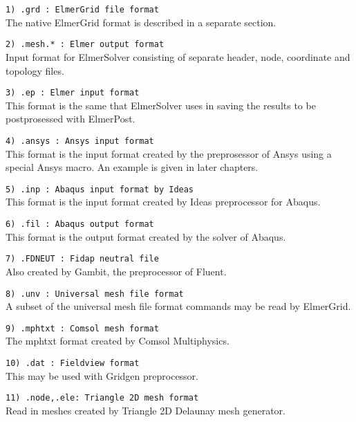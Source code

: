 \begin{description}
\item \texttt{1)  .grd      : ElmerGrid file format} \\
The native ElmerGrid format is  described in a separate section.

\item \texttt{2)  .mesh.*  : Elmer output format} \\
Input format for ElmerSolver consisting of separate header,
node, coordinate and topology files.

\item \texttt{3)  .ep      : Elmer input format} \\
This format is the same that
ElmerSolver uses in saving the results to be 
postprosessed with ElmerPost. 

\item \texttt{4)  .ansys    : Ansys input format} \\
This format is the input format 
created by the preprosessor of Ansys using a special
Ansys macro.
An example is given in later chapters.

\item \texttt{5)  .inp    : Abaqus input format by Ideas} \\
This format is the input format 
created by Ideas preprocessor for Abaqus.

\item \texttt{6)  .fil    : Abaqus output format} \\
This format is the output format 
created by the solver of Abaqus.

\item \texttt{7)  .FDNEUT  : Fidap neutral file} \\
Also created by Gambit, the preprocessor of Fluent.

\item \texttt{8) .unv : Universal mesh file format} \\
A subset of the universal mesh file format commands may be read by ElmerGrid.

\item \texttt{9)  .mphtxt   : Comsol mesh format} \\
The mphtxt format created by Comsol Multiphysics. 

\item \texttt{10)  .dat      : Fieldview format} \\
This may be used with Gridgen preprocessor.

\item \texttt{11) .node,.ele: Triangle 2D mesh format} \\
Read in meshes created by Triangle 2D Delaunay mesh generator.


\end{description}
